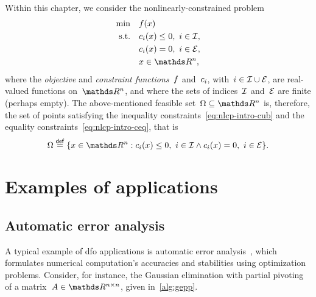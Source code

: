 Within this chapter, we consider the nonlinearly-constrained problem
\begin{subequations}
    \label{eq:nlcp-intro}
    \begin{align}
        \min        & \quad \obj(x)\\
        \text{s.t.} & \quad \con{i}(x) \le 0, ~ i \in \iub, \label{eq:nlcp-intro-cub}\\
                    & \quad \con{i}(x) = 0, ~ i \in \ieq, \label{eq:nlcp-intro-ceq}\\
                    & \quad x \in \R^n, \nonumber
    \end{align}
\end{subequations}
where the \emph{objective} and \emph{constraint functions}~$f$ and~$c_{i}$, with~$i \in \mathcal{I} \cup \mathcal{E}$, are real-valued functions on~$\R^n$, and where the sets of indices~$\mathcal{I}$ and~$\mathcal{E}$ are finite (perhaps empty).
The above-mentioned feasible set~$\Omega \subseteq \R^n$ is, therefore, the set of points satisfying the inequality constraints~\cref{eq:nlcp-intro-cub} and the equality constraints~\cref{eq:nlcp-intro-ceq}, that is
\begin{equation*}
    \Omega \eqdef \set{x \in \R^n : \con{i}(x) \le 0, ~ i \in \iub \land \con{i}(x) = 0, ~ i \in \ieq}.
\end{equation*}

\section{Examples of applications}

\subsection{Automatic error analysis}

A typical example of \gls{dfo} applications is automatic error analysis~\cite{Higham_1993,Higham_2002}, which formulates numerical computation's accuracies and stabilities using optimization problems.
Consider, for instance, the Gaussian elimination with partial pivoting of a matrix~$A \in \R^{n \times n}$, given in~\cref{alg:gepp}.

